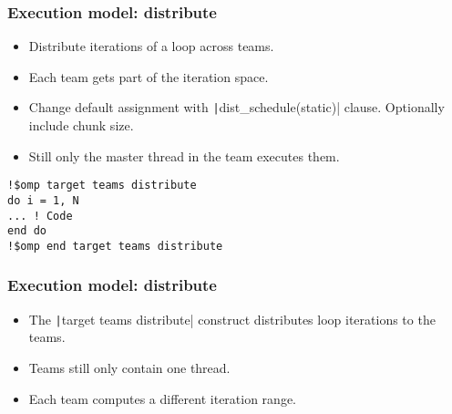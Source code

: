 \documentclass{beamer}
\begin{document}
\begin{frame}[fragile]
\frametitle{Execution model: distribute}
\begin{itemize}
  \item Distribute iterations of a loop across teams.
  \item Each team gets part of the iteration space.
  \item Change default assignment with \texttt|dist_schedule(static)| clause. Optionally include chunk size.
  \item Still only the master thread in the team executes them.
\end{itemize}

\begin{verbatim}
!$omp target teams distribute
do i = 1, N
... ! Code
end do
!$omp end target teams distribute
\end{verbatim}
\end{frame}

\begin{frame}
\frametitle{Execution model: distribute}
\begin{itemize}
  \item The \texttt|target teams distribute| construct distributes loop iterations to the teams.
  \item Teams still only contain one thread.
  \item Each team computes a different iteration range.
\end{itemize}

\begin{center}
\end{center}
\end{frame}
\end{document}

